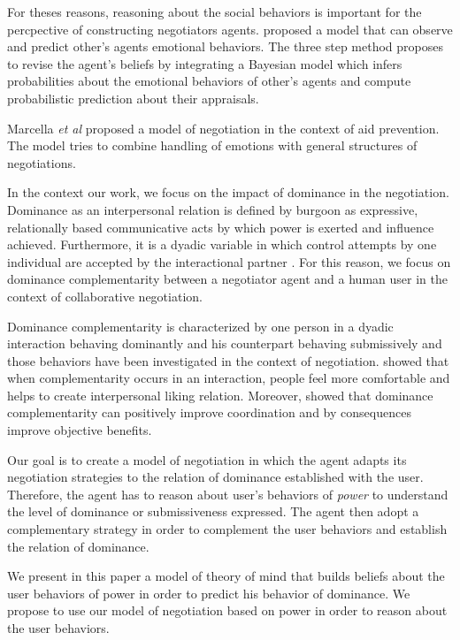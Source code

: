\documentclass[sigconf]{aamas}  %
\begin{document}
	
	For theses reasons, reasoning about the social behaviors is important for the percpective of constructing negotiators agents. \cite{alfonso2015emotional} proposed a model that can observe and predict other's agents emotional behaviors. The three step method proposes to revise the agent's  beliefs by integrating a Bayesian model which infers probabilities about the emotional behaviors of other's agents and compute probabilistic prediction about their appraisals.
	
	Marcella \textit{et al} \cite{klatt2011negotiations} proposed a model of negotiation in the context of aid prevention. The model tries to combine handling of emotions with general structures of negotiations. 
	
	In the context our work, we focus on the impact of dominance in the negotiation. Dominance as an interpersonal relation is defined by burgoon \cite{burgoon1998nature} as expressive, relationally based communicative acts by which power is exerted and influence achieved. Furthermore, it is a dyadic variable in which control attempts by one individual are accepted by the
	interactional partner \cite{dunbar2005perceptions}. For this reason, we focus on dominance complementarity between a negotiator agent and a human user in the context of collaborative negotiation. 
	
	Dominance complementarity is characterized by one person in a dyadic interaction behaving dominantly and his counterpart behaving submissively \cite{tiedens2003power} and those behaviors have been investigated in the context of negotiation. \cite{tiedens2003power} showed that when complementarity occurs in an interaction, people feel more comfortable and helps to create interpersonal liking relation.
	Moreover, \cite{wiltermuth2015benefits} showed that dominance complementarity can positively improve coordination and by consequences improve objective benefits.
	
	Our goal is to create a model of negotiation in which the agent adapts its negotiation strategies to the relation of dominance established with the user. Therefore, the agent has to reason about user's behaviors of \emph{power} to understand the level of dominance or submissiveness expressed. The agent then adopt a complementary strategy in order to complement the user behaviors and establish the relation of dominance.
	
	We present in this paper a model of theory of mind that builds beliefs about the user behaviors of power in order to predict his behavior of dominance. We propose to use our model of negotiation based on power in order to reason about the user behaviors. 
\end{document}
